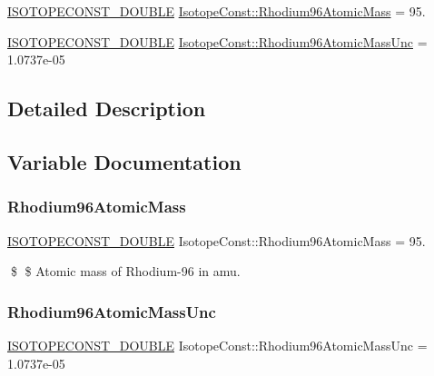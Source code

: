 \begin{DoxyCompactItemize}
\item 
\mbox{\hyperlink{group___isotope_const-_macros_ga8f45a7272ce02c0b4c65c44636ed719a}{I\+S\+O\+T\+O\+P\+E\+C\+O\+N\+S\+T\+\_\+\+D\+O\+U\+B\+LE}} \mbox{\hyperlink{group___isotope_const-_rhodium-_rh96_ga3e342d61c026ccd60573a42f352959cc}{Isotope\+Const\+::\+Rhodium96\+Atomic\+Mass}} = 95.
\item 
\mbox{\hyperlink{group___isotope_const-_macros_ga8f45a7272ce02c0b4c65c44636ed719a}{I\+S\+O\+T\+O\+P\+E\+C\+O\+N\+S\+T\+\_\+\+D\+O\+U\+B\+LE}} \mbox{\hyperlink{group___isotope_const-_rhodium-_rh96_ga568d3f1a6fa9eb637415d302f7dfd3d3}{Isotope\+Const\+::\+Rhodium96\+Atomic\+Mass\+Unc}} = 1.\+0737e-\/05
\end{DoxyCompactItemize}


\subsection{Detailed Description}


\subsection{Variable Documentation}
\mbox{\label{group___isotope_const-_rhodium-_rh96_ga3e342d61c026ccd60573a42f352959cc}} 
\subsubsection{\texorpdfstring{Rhodium96\+Atomic\+Mass}{Rhodium96AtomicMass}}
{\footnotesize\ttfamily \mbox{\hyperlink{group___isotope_const-_macros_ga8f45a7272ce02c0b4c65c44636ed719a}{I\+S\+O\+T\+O\+P\+E\+C\+O\+N\+S\+T\+\_\+\+D\+O\+U\+B\+LE}} Isotope\+Const\+::\+Rhodium96\+Atomic\+Mass = 95.}

\$ \$ Atomic mass of Rhodium-\/96 in amu. \mbox{\label{group___isotope_const-_rhodium-_rh96_ga568d3f1a6fa9eb637415d302f7dfd3d3}} 
\subsubsection{\texorpdfstring{Rhodium96\+Atomic\+Mass\+Unc}{Rhodium96AtomicMassUnc}}
{\footnotesize\ttfamily \mbox{\hyperlink{group___isotope_const-_macros_ga8f45a7272ce02c0b4c65c44636ed719a}{I\+S\+O\+T\+O\+P\+E\+C\+O\+N\+S\+T\+\_\+\+D\+O\+U\+B\+LE}} Isotope\+Const\+::\+Rhodium96\+Atomic\+Mass\+Unc = 1.\+0737e-\/05}

